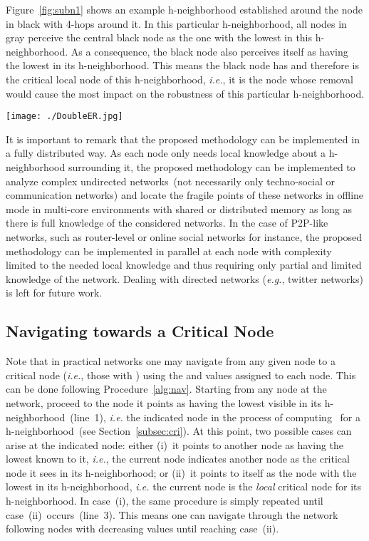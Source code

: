 \documentclass[conference,fleqn]{IEEEtran}
\begin{document}
Figure~\ref{fig:subn1} shows an example h-neighborhood established around the node in black with 4-hops around it.
In this particular h-neighborhood, all nodes in gray perceive the central black node as the one with the lowest  in this
h-neighborhood. As a consequence, the black node also perceives itself as having the lowest  in its h-neighborhood. This
means the black node has  and therefore is the critical local node of this h-neighborhood, \textit{i.e.}, it is the node whose
removal would cause the most impact on the robustness of this particular h-neighborhood.  

\begin{figure*}[ht]
 \centering
 \texttt{[image: ./DoubleER.jpg]}
 \caption{h-neighborhood in which a node (in black) has .}
 \label{fig:subn1}
\end{figure*}

It is important to remark that the proposed methodology can be implemented in a fully distributed way. 
As each node only needs local knowledge about a h-neighborhood surrounding it, 
the proposed methodology can be implemented to analyze complex undirected networks~(not necessarily only techno-social or communication networks)
and locate the fragile points of these networks in offline mode in multi-core environments with shared or distributed memory as long as there 
is full knowledge of the considered networks. In the case of P2P-like networks, such as router-level or online social networks
for instance, the proposed methodology can be implemented in parallel at each node with complexity limited to the needed local knowledge and 
thus requiring only partial and limited knowledge of the network. Dealing with directed networks (\textit{e.g.}, twitter networks) is left for 
future work.

\subsection{Navigating towards a Critical Node}
\label{subsec:nav}

Note that in practical networks one may navigate from any given node to a critical node (\textit{i.e.}, those with ) using the 
 and  values assigned to each node.
This can be done following Procedure~\ref{alg:nav}. Starting from any node at the network, proceed to the node it points as having the lowest 
visible  in its h-neighborhood~(line~1), \textit{i.e.} the indicated node in the process of computing~ for a 
h-neighborhood~(see Section~\ref{subsec:cri}).
At this point, two possible cases can arise at the indicated node: 
either (i)~it points to another node as having the lowest known  to it, \textit{i.e.}, the current node indicates another
node as the critical node it sees in its h-neighborhood; or
(ii)~it points to itself as the node with the lowest  in its h-neighborhood, \textit{i.e.} the current
node is the \emph{local} critical node for its h-neighborhood.
In case~(i), the same procedure is simply repeated until case~(ii)~occurs~(line~3). This means one can navigate through the network
following nodes with decreasing  values until reaching case~(ii). 
\end{document}
